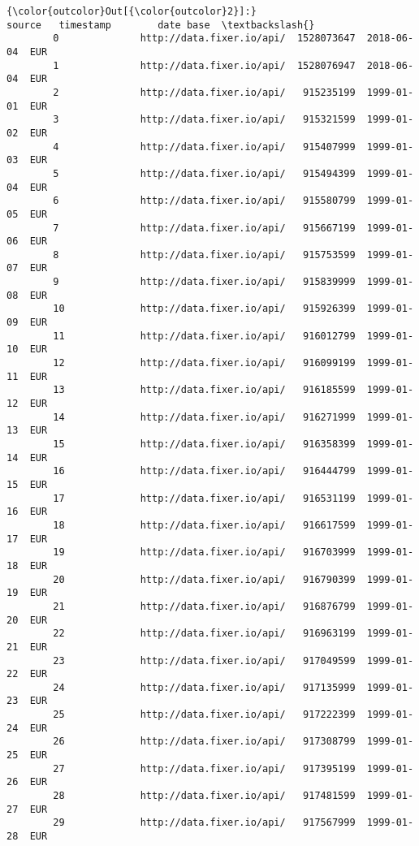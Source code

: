 \documentclass[11pt]{article}
\begin{document}
\begin{Verbatim}[commandchars=\\\{\}]
{\color{outcolor}Out[{\color{outcolor}2}]:}                                   source   timestamp        date base  \textbackslash{}
        0              http://data.fixer.io/api/  1528073647  2018-06-04  EUR   
        1              http://data.fixer.io/api/  1528076947  2018-06-04  EUR   
        2              http://data.fixer.io/api/   915235199  1999-01-01  EUR   
        3              http://data.fixer.io/api/   915321599  1999-01-02  EUR   
        4              http://data.fixer.io/api/   915407999  1999-01-03  EUR   
        5              http://data.fixer.io/api/   915494399  1999-01-04  EUR   
        6              http://data.fixer.io/api/   915580799  1999-01-05  EUR   
        7              http://data.fixer.io/api/   915667199  1999-01-06  EUR   
        8              http://data.fixer.io/api/   915753599  1999-01-07  EUR   
        9              http://data.fixer.io/api/   915839999  1999-01-08  EUR   
        10             http://data.fixer.io/api/   915926399  1999-01-09  EUR   
        11             http://data.fixer.io/api/   916012799  1999-01-10  EUR   
        12             http://data.fixer.io/api/   916099199  1999-01-11  EUR   
        13             http://data.fixer.io/api/   916185599  1999-01-12  EUR   
        14             http://data.fixer.io/api/   916271999  1999-01-13  EUR   
        15             http://data.fixer.io/api/   916358399  1999-01-14  EUR   
        16             http://data.fixer.io/api/   916444799  1999-01-15  EUR   
        17             http://data.fixer.io/api/   916531199  1999-01-16  EUR   
        18             http://data.fixer.io/api/   916617599  1999-01-17  EUR   
        19             http://data.fixer.io/api/   916703999  1999-01-18  EUR   
        20             http://data.fixer.io/api/   916790399  1999-01-19  EUR   
        21             http://data.fixer.io/api/   916876799  1999-01-20  EUR   
        22             http://data.fixer.io/api/   916963199  1999-01-21  EUR   
        23             http://data.fixer.io/api/   917049599  1999-01-22  EUR   
        24             http://data.fixer.io/api/   917135999  1999-01-23  EUR   
        25             http://data.fixer.io/api/   917222399  1999-01-24  EUR   
        26             http://data.fixer.io/api/   917308799  1999-01-25  EUR   
        27             http://data.fixer.io/api/   917395199  1999-01-26  EUR   
        28             http://data.fixer.io/api/   917481599  1999-01-27  EUR   
        29             http://data.fixer.io/api/   917567999  1999-01-28  EUR   

\end{Verbatim}
\end{document}
